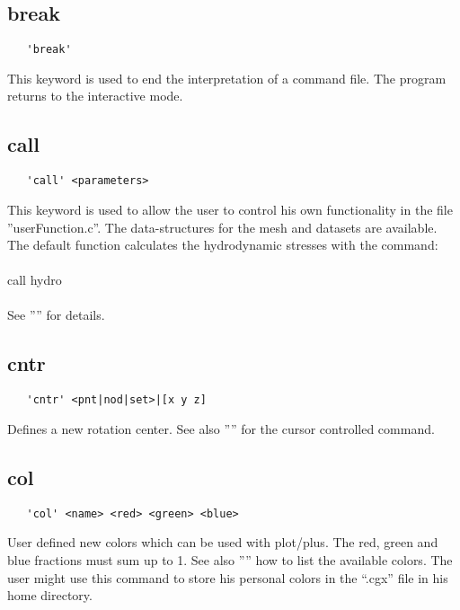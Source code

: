 \documentclass{article}
\begin{document}
\subsection{\label{break}break}
\begin{verbatim}
   'break'
\end{verbatim}
This keyword is used to end the interpretation of a command file. The program returns to the interactive mode.

\subsection{\label{call}call}
\begin{verbatim}
   'call' <parameters>
\end{verbatim}
This keyword is used to allow the user to control his own functionality in the file ''userFunction.c''. The data-structures for the mesh and datasets are available. The default function calculates the hydrodynamic stresses with the command:\\\\call hydro\\\\See '''' for  details. 

\subsection{\label{cntr}cntr}
\begin{verbatim}
   'cntr' <pnt|nod|set>|[x y z]
\end{verbatim}
Defines a new rotation center. See also '''' for the cursor controlled command.

\subsection{\label{col}col}
\begin{verbatim}
   'col' <name> <red> <green> <blue>
\end{verbatim}
User defined new colors which can be used with plot/plus. The red, green and blue fractions must sum up to 1. See also '''' how to list the available colors. The user might use this command to store his personal colors in the ``.cgx'' file in his home directory.
\end{document}
